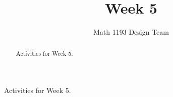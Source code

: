 \documentclass[noauthor]{ximera}
\title{Week 5}
\author{Math 1193 Design Team}
\begin{document}
\begin{abstract}
    Activities for Week 5.
\end{abstract}
\maketitle

Activities for Week 5.
\end{document}
